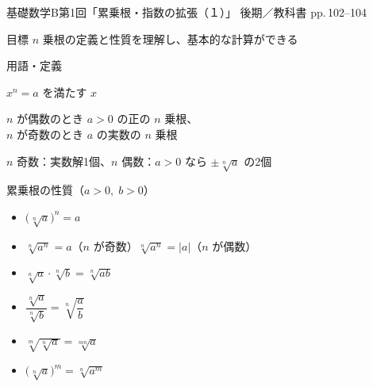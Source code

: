 \documentclass[aspectratio=43,professionalfonts,handout]{beamer}
\newcommand{\LectureNum}{1}
\newcommand{\LectureTitle}{累乗根・指数の拡張（１）}
\newcommand{\TextPages}{pp.\,102--104}
\newcommand{\CourseName}{基礎数学B}
\renewcommand{\TermName}{後期}
\begin{document}
\begin{frame}{\CourseName\quad 第\LectureNum 回「\LectureTitle 」}
  {\small \TermName\quad \TeacherName\quad ／\quad 教科書 \TextPages}

  \begin{block}{目標}
    $n$ 乗根の定義と性質を理解し、基本的な計算ができる
  \end{block}

  \begin{block}{用語・定義}
  \begin{description}[labelwidth=5em]
    \item[\kw{$a$ の $n$ 乗根}] $x^n = a$ を満たす $x$
    \item[\kw{$\sqrt[n]{a}$}] $n$ が偶数のとき $a>0$ の正の $n$ 乗根、\\
                               $n$ が奇数のとき $a$ の実数の $n$ 乗根
    \item[\kw{$n$ 乗根の個数}] $n$ 奇数：実数解1個、$n$ 偶数：$a>0$ なら $\pm\sqrt[n]{a}$ の2個
  \end{description}
  \end{block}
\end{frame}

\begin{frame}{累乗根の性質（$a>0,\;b>0$）}
  \begin{block}{}
  \begin{itemize}
    \item $\bigl(\sqrt[n]{a}\bigr)^n = a$
    \item $\sqrt[n]{a^n} = a$（$n$ が奇数）\quad$\sqrt[n]{a^n} = |a|$（$n$ が偶数）
    \item $\sqrt[n]{a}\cdot\sqrt[n]{b} = \sqrt[n]{ab}$
    \item $\dfrac{\sqrt[n]{a}}{\sqrt[n]{b}} = \sqrt[n]{\dfrac{a}{b}}$
    \item $\sqrt[m]{\sqrt[n]{a}} = \sqrt[mn]{a}$
    \item $\bigl(\sqrt[n]{a}\bigr)^m = \sqrt[n]{a^m}$
  \end{itemize}
  \end{block}
\end{frame}
\end{document}
